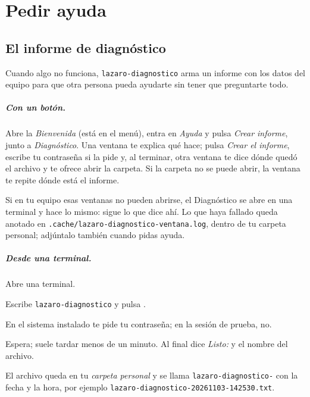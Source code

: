 \chapter{Pedir ayuda}\label{cap:17-pedir-ayuda}

\section{El informe de diagnóstico}

Cuando algo no funciona, \texttt{lazaro-diagnostico} arma un informe con
los datos del equipo para que otra persona pueda ayudarte sin tener que
preguntarte todo.

\paragraph{Con un botón.} Abre la \emph{Bienvenida} (está en el menú),
entra en \emph{Ayuda} y pulsa \emph{Crear informe}, junto a
\emph{Diagnóstico}. Una ventana te explica qué hace; pulsa \emph{Crear el
informe}, escribe tu contraseña si la pide y, al terminar, otra ventana te
dice dónde quedó el archivo y te ofrece abrir la carpeta. Si la carpeta
no se puede abrir, la ventana te repite dónde está el informe.


Si en tu equipo esas ventanas no pueden abrirse, el Diagnóstico se abre
en una terminal y hace lo mismo: sigue lo que dice ahí. Lo que haya
fallado queda anotado en \texttt{.cache/lazaro-diagnostico-ventana.log},
dentro de tu carpeta personal; adjúntalo también cuando pidas ayuda.

\paragraph{Desde una terminal.}

\begin{pasos}
  \item Abre una terminal.
  \item Escribe \texttt{lazaro-diagnostico} y pulsa .
  \item En el sistema instalado te pide tu contraseña; en la sesión de
        prueba, no.
  \item Espera; suele tardar menos de un minuto. Al final dice
        \emph{Listo:} y el nombre del archivo.
  \item El archivo queda en tu \emph{carpeta personal} y se llama
        \texttt{lazaro-diagnostico-} con la fecha y la hora, por ejemplo
        \texttt{lazaro-diagnostico-20261103-142530.txt}.
\end{pasos}

